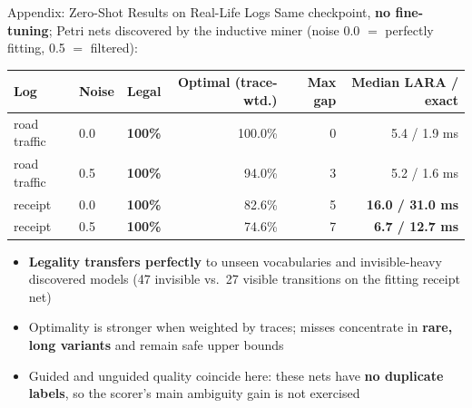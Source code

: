 \documentclass[aspectratio=169]{beamer}
\newcommand{\keyc}[1]{\textbf{\textcolor{larablue}{#1}}}
\newcommand{\keyg}[1]{\textbf{\textcolor{laraaqua!70!black}{#1}}}
\newcommand{\keya}[1]{\textbf{\textcolor{laraamber!85!black}{#1}}}
\begin{document}
\begin{frame}{Appendix: Zero-Shot Results on Real-Life Logs}
  Same checkpoint, \keya{no fine-tuning}; Petri nets discovered by the
  inductive miner (noise 0.0 $=$ perfectly fitting, 0.5 $=$ filtered):
  \vspace{2mm}
  \begin{center}
  \footnotesize
  \begin{tabular}{llrrrr}
    \toprule
    Log & Noise & Legal & Optimal (trace-wtd.) & Max gap & Median LARA / exact \\
    \midrule
    road traffic & 0.0 & \keyg{100\%} & 100.0\% & 0 & 5.4 / 1.9 ms \\
    road traffic & 0.5 & \keyg{100\%} & 94.0\%  & 3 & 5.2 / 1.6 ms \\
    receipt      & 0.0 & \keyg{100\%} & 82.6\%  & 5 & \keyc{16.0 / 31.0 ms} \\
    receipt      & 0.5 & \keyg{100\%} & 74.6\%  & 7 & \keyc{6.7 / 12.7 ms} \\
    \bottomrule
  \end{tabular}
  \end{center}
  \vspace{3mm}
  \begin{itemize}\setlength{\itemsep}{5pt}
    \item \keyg{Legality transfers perfectly} to unseen vocabularies and
      invisible-heavy discovered models (47 invisible vs.\ 27 visible
      transitions on the fitting receipt net)
    \item Optimality is stronger when weighted by traces; misses concentrate
      in \keya{rare, long variants} and remain safe upper bounds
    \item Guided and unguided quality coincide here: these nets have
      \keya{no duplicate labels}, so the scorer's main ambiguity gain is
      not exercised
  \end{itemize}
\end{frame}
\end{document}
